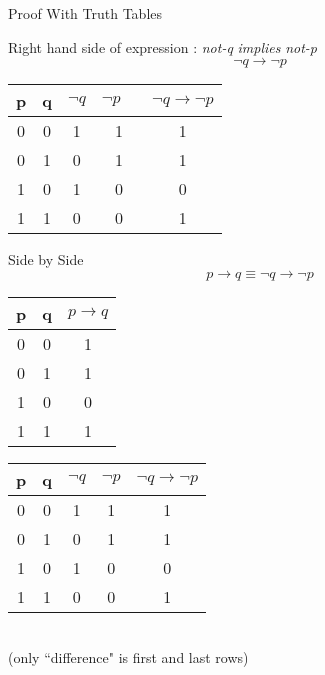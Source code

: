{Proof With Truth Tables}

Right hand side of expression : \textit{not-q} \textit{implies} \textit{not-p}
\[\neg q \rightarrow \neg p\]
\begin{center}
\begin{tabular}{|c|c||c|c|c|}
\hline  \phantom{sp}p\phantom{sp}&  \phantom{sp}q\phantom{sp}&\phantom{sp} $\neg q$ \phantom{sp} & \phantom{sp} $\neg p \phantom{sp}$ & $\neg q \rightarrow \neg p$ \\ 
\hline  0&  0& 1& 1& 1\\ 
\hline  0&  1& 0& 1& 1\\ 
\hline  1&  0& 1& 0& 0\\ 
\hline  1&  1& 0& 0& 1\\ 
\hline 
\end{tabular}
\end{center}


Side by Side
\[ p \rightarrow q \equiv \neg q \rightarrow \neg p\]
\bigskip
{ 
\hspace{0.5cm} \begin{tabular}{|c|c||c|}
\hline  p&  q& $p \rightarrow q$ \\ 
\hline  0&  0&  1\\ 
\hline  0&  1&  1\\ 
\hline  1&  0&  0\\ 
\hline  1&  1&  1\\ 
\hline 
\end{tabular} \hspace{0.5cm} \begin{tabular}{|c|c||c|c|c|}
\hline  p&  q& $\neg q$ & $\neg p$ & $\neg q \rightarrow \neg p$ \\ 
\hline  0&  0& 1& 1& 1\\ 
\hline  0&  1& 0& 1& 1\\ 
\hline  1&  0& 1& 0& 0\\ 
\hline  1&  1& 0& 0& 1\\ 
\hline 
\end{tabular}
}\\
(only ``difference" is first and last rows)





